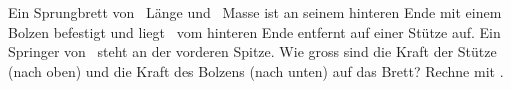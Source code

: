 Ein Sprungbrett von \LBO\ Länge und \mBO\ Masse ist an seinem hinteren Ende mit einem Bolzen befestigt und liegt \bSO\ vom hinteren Ende entfernt auf einer Stütze auf. Ein Springer von \mSO\ steht an der vorderen Spitze. Wie gross sind die Kraft der Stütze (nach oben) und die Kraft des Bolzens (nach unten) auf das Brett? Rechne mit \gO.

